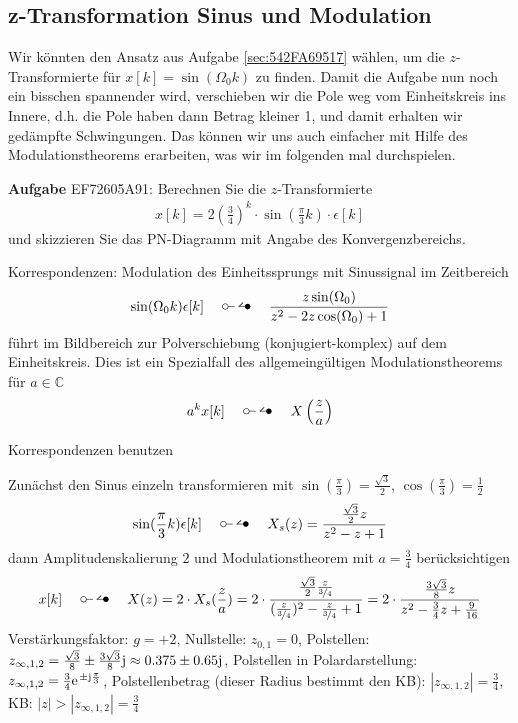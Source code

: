 \newpage
\subsection{z-Transformation Sinus und Modulation}
\label{sec:EF72605A91}
\begin{Ziel}
Wir könnten den Ansatz aus Aufgabe \ref{sec:542FA69517} wählen, um die
$z$-Transformierte für $x[k]=\sin(\Omega_0 k)$ zu finden.
Damit die Aufgabe nun noch ein bisschen spannender wird, verschieben wir die Pole
weg vom Einheitskreis ins Innere, d.h. die Pole haben dann Betrag kleiner 1,
und damit erhalten wir gedämpfte Schwingungen.
Das können wir uns auch einfacher mit Hilfe des Modulationstheorems erarbeiten,
was wir im folgenden mal durchspielen.
\end{Ziel}
\textbf{Aufgabe} {\tiny EF72605A91}: Berechnen Sie die $z$-Transformierte
\begin{align}
x[k] = 2 \left(\frac{3}{4}\right)^k \cdot \sin(\frac{\pi}{3} k) \cdot \epsilon[k]
\end{align}
und skizzieren Sie das PN-Diagramm mit Angabe des Konvergenzbereichs.
\begin{Werkzeug}
Korrespondenzen:
%
Modulation des Einheitssprungs mit Sinussignal im Zeitbereich
\begin{align}
\sin(\Omega_0 k)\epsilon[k]\quad\ztransf\quad\frac{z\sin(\Omega_0)}{z^2 -2 z \cos(\Omega_0)+1}
\end{align}
führt im Bildbereich zur Polverschiebung (konjugiert-komplex) auf dem Einheitskreis.
%
Dies ist ein Spezialfall des allgemeingültigen Modulationstheorems für
$a\in\mathbb{C}$
\begin{align}
a^k x[k] \quad\ztransf\quad X\left(\frac{z}{a} \right)
\end{align}
\end{Werkzeug}
\begin{Ansatz}
Korrespondenzen benutzen
\end{Ansatz}
\begin{ExCalc}
Zunächst den Sinus einzeln transformieren mit
$\sin(\frac{\pi}{3}) = \frac{\sqrt{3}}{2}$, $\cos(\frac{\pi}{3}) = \frac{1}{2}$
\begin{align}
\sin(\frac{\pi}{3} k) \epsilon[k] \quad\ztransf\quad X_s(z) = \frac{\frac{\sqrt{3}}{2}z}{z^2 - z +1}
\end{align}
dann Amplitudenskalierung $2$ und Modulationstheorem mit $a=\frac{3}{4}$ berücksichtigen
\begin{align}
x[k] \quad\ztransf\quad X(z) = 2 \cdot X_s(\frac{z}{a}) =
2 \cdot \frac{\frac{\sqrt{3}}{2} \frac{z}{\nicefrac{3}{4}}}{(\frac{z}{\nicefrac{3}{4}})^2 - \frac{z}{\nicefrac{3}{4}} +1}
=
2 \cdot \frac{\frac{3\sqrt{3}}{8} z}{z^2 - \frac{3}{4}z + \frac{9}{16}}
\end{align}
%
Verstärkungsfaktor: $g=+2$,
%
Nullstelle: $z_{0,1} = 0$,
%
Polstellen: $z_{\infty,1,2} = \frac{\sqrt{3}}{8} \pm \frac{3\sqrt{3}}{8} \im \approx 0.375 \pm 0.65\im$,
%
Polstellen in Polardarstellung: $z_{\infty,1,2} = \frac{3}{4}\e^{\pm\im \frac{\pi}{3}}$,
%
Polstellenbetrag (dieser Radius bestimmt den KB): $|z_{\infty,1,2}| = \frac{3}{4}$,
%
KB: $|z|>|z_{\infty,1,2}| = \frac{3}{4}$

\end{ExCalc}
